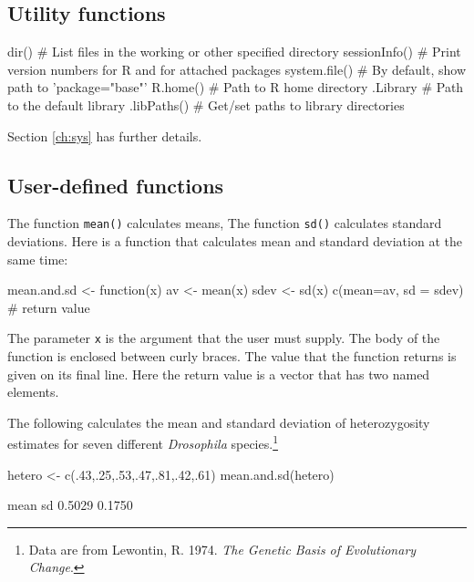 \documentclass{tufte-book}\usepackage[]{graphicx}\usepackage[]{color}
\newcommand{\txtt}[1]{\texttt{#1}}
\begin{document}
\subsection{Utility functions}
\begin{fullwidth}
\begin{verbcode}
dir()             # List files in the working or other specified directory
sessionInfo()     # Print version numbers for R and for attached packages
system.file()     # By default, show path to 'package="base"'
R.home()          # Path to R home directory
.Library          # Path to the default library
.libPaths()       # Get/set paths to library directories
\end{verbcode}
\end{fullwidth}
Section \ref{ch:sys} has further details.

\subsection{User-defined functions}
The function \txtt{mean()} calculates means, The function \txtt{sd()}
calculates standard deviations. Here is a function that calculates
mean and standard deviation at the same time:
\begin{Schunk}
\begin{Sinput}
mean.and.sd <- function(x){
    av <- mean(x)
    sdev <- sd(x)
    c(mean=av, sd = sdev)   # return value
}
\end{Sinput}
\end{Schunk}
The parameter \txtt{x} is the argument that the user must supply.
The body of the function is enclosed between curly braces. The value
that the function returns is given on its final line. Here the return
value is a vector that has two named elements.

The following calculates the mean and standard deviation of
heterozygosity estimates for seven different \textit{Drosophila}
species.\footnote{Data are from Lewontin, R. 1974. \textit{The Genetic
    Basis of Evolutionary Change}.}
\begin{Schunk}
\begin{Sinput}
hetero <- c(.43,.25,.53,.47,.81,.42,.61)
mean.and.sd(hetero)
\end{Sinput}
\begin{Soutput}
  mean     sd 
0.5029 0.1750 
\end{Soutput}
\end{Schunk}
\end{document}
